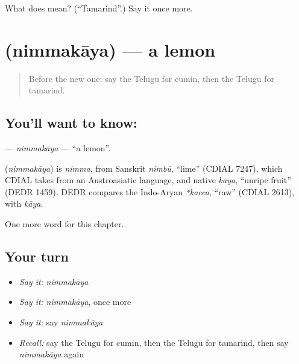 \begin{tcolorbox}[breakable,colback=teal!4,colframe=teal!35!black,title={Before you move on}]
What does  mean? (\textquotedblleft{}Tamarind\textquotedblright{}.) Say it once more.
\end{tcolorbox}
\section[\texorpdfstring{\te{నిమ్మకాయ} (nimmakāya)}{నిమ్మకాయ (nimmakāya)}]{ (nimmakāya) — a lemon}

\label{lesson:TE-C135-nimmakaya}



\begin{quote}
Before the new one: say the Telugu for cumin, then the Telugu for tamarind.
\end{quote}

\subsection*{You'll want to know: }
\textbf{} — \emph{nimmakāya} — \textquotedblleft{}a lemon\textquotedblright{}.

\begin{cousinweb}
\textbf{} (\emph{nimmakāya}) is \emph{nimma}, from Sanskrit \emph{nimbū}, \textquotedblleft{}lime\textquotedblright{} (CDIAL 7247), which CDIAL takes from an Austroasiatic language, and native \emph{kāya}, \textquotedblleft{}unripe fruit\textquotedblright{} (DEDR 1459). DEDR compares the Indo-Aryan \emph{*kacca}, \textquotedblleft{}raw\textquotedblright{} (CDIAL 2613), with \emph{kāya}.
\end{cousinweb}

\begin{grammarlens}[title={What you've built}]
One more word for this chapter.
\end{grammarlens}

\subsection*{Your turn}
\begin{itemize}
\raggedright
  \item \emph{Say it:} \emph{nimmakāya}
  \item \emph{Say it:} \emph{nimmakāya}, once more
  \item \emph{Say it:} say \emph{nimmakāya}
  \item \emph{Recall:} say the Telugu for cumin, then the Telugu for tamarind, then say \emph{nimmakāya} again
\end{itemize}

